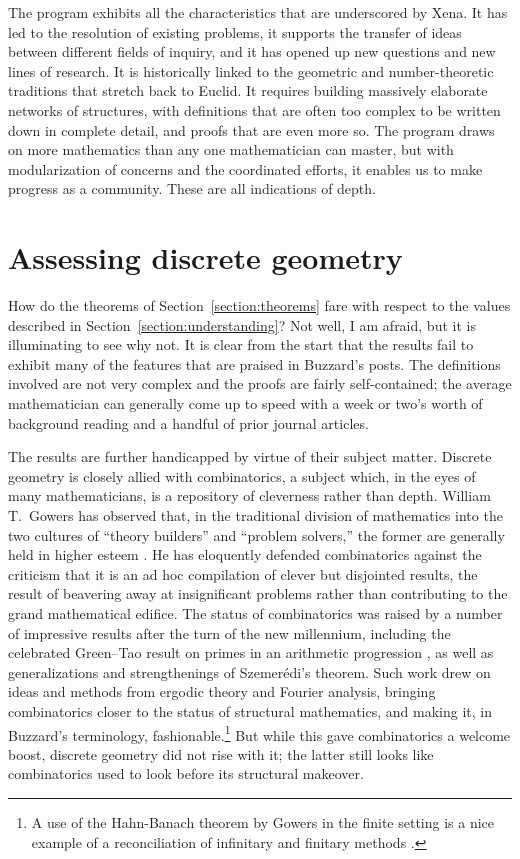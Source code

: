 \documentclass{amsart}
\theoremstyle{definition}
\theoremstyle{remark}
\numberwithin{equation}{section}
\begin{document}
The program exhibits all the characteristics that are underscored by Xena. It has led to the resolution of existing problems, it supports the transfer of ideas between different fields of inquiry, and it has opened up new questions and new lines of research. It is historically linked to the geometric and number-theoretic traditions that stretch back to Euclid. It requires building massively elaborate networks of structures, with definitions that are often too complex to be written down in complete detail, and proofs that are even more so. The program draws on more mathematics than any one mathematician can master, but with modularization of concerns and the coordinated efforts, it enables us to make progress as a community. These are all indications of depth.

\section{Assessing discrete geometry}
\label{section:assessment}

How do the theorems of Section~\ref{section:theorems} fare with respect to the values described in Section~\ref{section:understanding}? Not well, I am afraid, but it is illuminating to see why not. It is clear from the start that the results fail to exhibit many of the features that are praised in Buzzard's posts. The definitions involved are not very complex and the proofs are fairly self-contained; the average mathematician can generally come up to speed with a week or two's worth of background reading and a handful of prior journal articles.

The results are further handicapped by virtue of their subject matter. Discrete geometry is closely allied with combinatorics, a subject which, in the eyes of many mathematicians, is a repository of cleverness rather than depth. William T.~Gowers has observed that, in the traditional division of mathematics into the two cultures of ``theory builders'' and ``problem solvers,'' the former are generally held in higher esteem \cite{gowers:00}. He has eloquently defended combinatorics against the criticism that it is an ad hoc compilation of clever but disjointed results, the result of beavering away at insignificant problems rather than contributing to the grand mathematical edifice. The status of combinatorics was raised by a number of impressive results after the turn of the new millennium, including the celebrated Green--Tao result on primes in an arithmetic progression \cite{green:tao:08}, as well as generalizations and strengthenings of Szemer\'edi's theorem. Such work drew on ideas and methods from ergodic theory and Fourier analysis, bringing combinatorics closer to the status of structural mathematics, and making it, in Buzzard's terminology, fashionable.\footnote{A use of the Hahn-Banach theorem by Gowers in the finite setting is a nice example of a reconciliation of infinitary and finitary methods \cite{gowers:10}.} But while this gave combinatorics a welcome boost, discrete geometry did not rise with it; the latter still looks like combinatorics used to look before its structural makeover.
\end{document}
